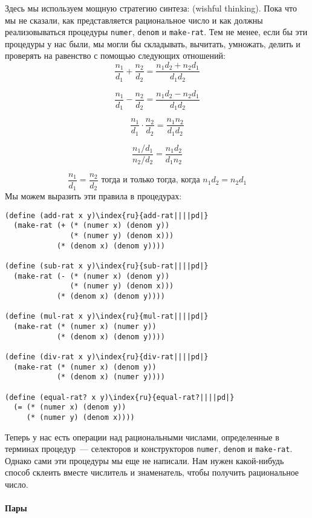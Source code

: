 Здесь мы используем мощную стратегию синтеза: 
 (wish\-ful thin\-king). Пока что мы не
сказали, как представляется рациональное число и как должны
реализовываться процедуры {\tt numer}, {\tt denom} и
{\tt make-rat}.  Тем не менее, если бы эти процедуры у нас
были, мы могли бы складывать, вычитать, умножать, делить и проверять
на равенство с помощью следующих отношений:
$$
\frac{n_1}{d_1} + \frac{n_2}{d_2} 
        = \frac{n_1 d_2 + n_2 d_1}{d_1 d_2}
$$

$$
\frac{n_1}{d_1} - \frac{n_2}{d_2}
        = \frac{n_1 d_2 - n_2 d_1}{d_1 d_2}
$$

$$
\frac{n_1}{d_1} \cdot \frac{n_2}{d_2}
        = \frac{n_1 n_2}{d_1 d_2}
$$

$$
\frac{n_1 / d_1}{n_2 / d_2}
        = \frac{n_1 d_2}{d_1 n_2}
$$

$$
\frac{n_1}{d_1} = \frac{n_2}{d_2} \mbox{ тогда и только тогда, 
когда } n_1 d_2 = n_2 d_1
$$
Мы можем выразить эти правила в процедурах:

\begin{Verbatim}[fontsize=\small]
(define (add-rat x y)\index{ru}{add-rat||||pd|}
  (make-rat (+ (* (numer x) (denom y))
               (* (numer y) (denom x)))
            (* (denom x) (denom y))))

(define (sub-rat x y)\index{ru}{sub-rat||||pd|}
  (make-rat (- (* (numer x) (denom y))
               (* (numer y) (denom x)))
            (* (denom x) (denom y))))

(define (mul-rat x y)\index{ru}{mul-rat||||pd|}
  (make-rat (* (numer x) (numer y))
            (* (denom x) (denom y))))

(define (div-rat x y)\index{ru}{div-rat||||pd|}
  (make-rat (* (numer x) (denom y))
            (* (denom x) (numer y))))

(define (equal-rat? x y)\index{ru}{equal-rat?||||pd|}
  (= (* (numer x) (denom y))
     (* (numer y) (denom x))))
\end{Verbatim}


Теперь у нас есть операции над рациональными числами,
определенные в терминах процедур~--- селекторов и конструкторов
{\tt numer}, {\tt denom} и {\tt make-rat}.
Однако сами эти процедуры мы еще не написали.  Нам нужен какой-нибудь 
способ склеить вместе числитель и знаменатель, чтобы получить
рациональное число.

\paragraph{Пары}


